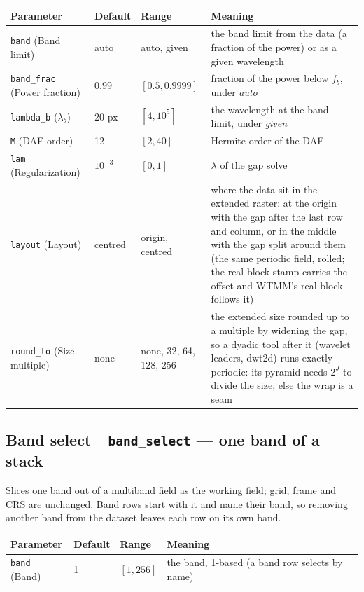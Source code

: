 \documentclass[10pt]{article}
\newcommand{\dev}[1]{\texttt{#1}}
\newcommand{\tool}[2]{#1~\textperiodcentered~\dev{#2}}
\begin{document}
\begin{longtable}{L l l M}
\toprule Parameter & Default & Range & Meaning \\ \midrule
\texttt{band} (Band limit) & auto & auto, given & the band limit from the data (a fraction of the power) or as a given wavelength \\
\texttt{band\_frac} (Power fraction) & 0.99 & $[0.5,0.9999]$ & fraction of the power below $f_b$, under \emph{auto} \\
\texttt{lambda\_b} ($\lambda_b$) & 20 px & $[4, 10^5]$ & the wavelength at the band limit, under \emph{given} \\
\texttt{M} (DAF order) & 12 & $[2,40]$ & Hermite order of the DAF \\
\texttt{lam} (Regularization) & $10^{-3}$ & $[0,1]$ & $\lambda$ of the gap solve \\
\texttt{layout} (Layout) & centred & origin, centred & where the data sit in the extended raster: at the origin with the gap after the last row and column, or in the middle with the gap split around them (the same periodic field, rolled; the real-block stamp carries the offset and WTMM's real block follows it) \\
\texttt{round\_to} (Size multiple) & none & none, 32, 64, 128, 256 & the extended size rounded up to a multiple by widening the gap, so a dyadic tool after it (wavelet leaders, dwt2d) runs exactly periodic: its pyramid needs $2^J$ to divide the size, else the wrap is a seam \\
\bottomrule
\end{longtable}

\subsection{\tool{Band select}{band\_select} --- one band of a stack}
Slices one band out of a multiband field as the working field; grid, frame and CRS are
unchanged. Band rows start with it and name their band, so removing another band from the
dataset leaves each row on its own band.

\begin{longtable}{L l l M}
\toprule Parameter & Default & Range & Meaning \\ \midrule
\texttt{band} (Band) & 1 & $[1,256]$ & the band, 1-based (a band row selects by name) \\
\bottomrule
\end{longtable}
\end{document}

